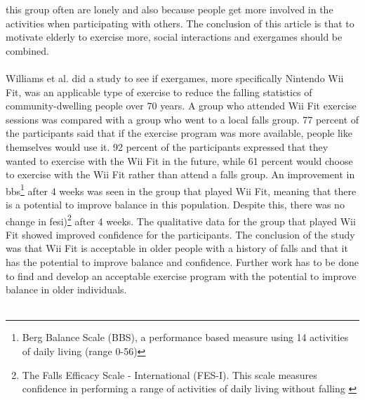 this group often are lonely and also because people get more involved in the activities when participating with others. The conclusion of this article is that to motivate elderly to exercise more, social interactions and exergames should be combined.\cite{exergamesforelderly} \\ \\
Williams et al. did a study to see if exergames, more specifically Nintendo Wii Fit, was an applicable type of exercise to reduce the falling statistics of community-dwelling people over 70 years. A group who attended Wii Fit exercise sessions was compared with a group who went to a local falls group. 77 percent of the participants said that if the exercise program was more available, people like themselves would use it. 92 percent of the participants expressed that they wanted to exercise with the Wii Fit in the future, while 61 percent would choose to exercise with the Wii Fit rather than attend a falls group. An improvement in \ac{bbs}\footnote{Berg Balance Scale (BBS), a performance based measure using 14 activities of daily living (range 0-56)\cite{excell}} after 4 weeks was seen in the group that played Wii Fit, meaning that there is a potential to improve balance in this population. Despite this, there was no change in \ac{fesi})\footnote{The Falls Efficacy Scale - International (FES-I). This scale measures confidence in performing a range of activities of daily living without falling \cite{fes}} after 4 weeks. The qualitative data for the group that played Wii Fit showed improved confidence for the participants. The conclusion of the study was that Wii Fit is acceptable in  older people with a history of falls and that it has the potential to improve balance and confidence. Further work has to be done to find and develop an acceptable exercise program with the potential to improve balance in older individuals. \cite{excell}\\ \\
